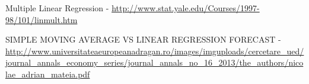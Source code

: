 \documentclass[11pt]{report}
\begin{document}
  \begin{thebibliography}{1}

   Multiple Linear Regression - \url{http://www.stat.yale.edu/Courses/1997-98/101/linmult.htm}

   SIMPLE MOVING AVERAGE VS LINEAR
REGRESSION FORECAST - \url{http://www.universitateaeuropeanadragan.ro/images/imguploads/cercetare_ued/journal_annals_economy_series/journal_annals_no_16_2013/the_authors/nicolae_adrian_mateia.pdf}

  \end{thebibliography}
  
\end{document}
